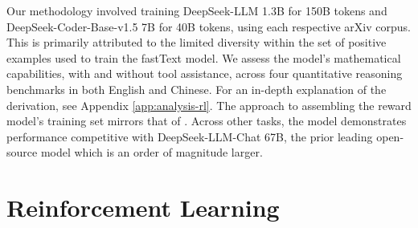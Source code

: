 \begin{itemize}[topsep=0pt]

Our methodology involved training DeepSeek-LLM 1.3B for 150B tokens and DeepSeek-Coder-Base-v1.5 7B for 40B tokens, using each respective arXiv corpus. This is primarily attributed to the limited diversity within the set of positive examples used to train the fastText model. We assess the model’s mathematical capabilities, with and without tool assistance, across four quantitative reasoning benchmarks in both English and Chinese. For an in-depth explanation of the derivation, see Appendix \ref{app:analysis-rl}. The approach to assembling the reward model's training set mirrors that of \citep{wang2023math}. Across other tasks, the model demonstrates performance competitive with DeepSeek-LLM-Chat 67B, the prior leading open-source model which is an order of magnitude larger. \section{Reinforcement Learning}


\end{itemize}
